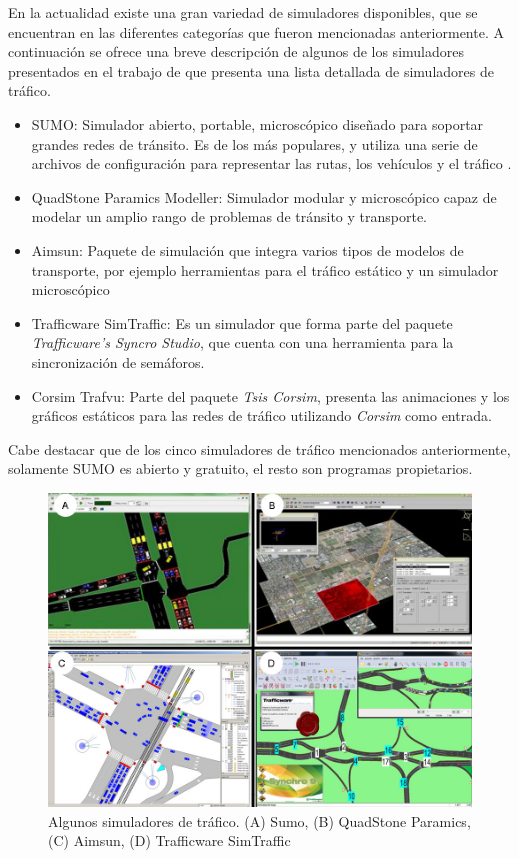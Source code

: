 En la actualidad existe una gran variedad de simuladores disponibles, que se encuentran en las diferentes categorías que fueron mencionadas anteriormente. A continuación se ofrece una breve descripción de algunos de los simuladores presentados en el trabajo de \citet{review_trafico} que presenta una lista detallada de simuladores de tráfico.
\begin{itemize}
	\item SUMO: Simulador abierto, portable, microscópico diseñado para soportar grandes redes de tránsito. Es de los más populares, y utiliza una serie de archivos de configuración para representar las rutas, los vehículos y el tráfico \citep{SUMO}.
	\item QuadStone Paramics Modeller: Simulador modular y microscópico capaz de modelar un amplio rango de problemas de tránsito y transporte.
	\item Aimsun: Paquete de simulación que integra varios tipos de modelos de transporte, por ejemplo herramientas para el tráfico estático y un simulador microscópico
	\item Trafficware SimTraffic: Es un simulador que forma parte del paquete \emph{Trafficware's Syncro Studio}, que cuenta con una herramienta para la sincronización de semáforos.
	\item Corsim Trafvu: Parte del paquete \emph{Tsis Corsim}, presenta las animaciones y los gráficos estáticos para las redes de tráfico utilizando \emph{Corsim} como entrada.
\end{itemize}

Cabe destacar que de los cinco simuladores de tráfico mencionados anteriormente, solamente SUMO es abierto y gratuito, el resto son programas propietarios. 

\begin{figure}[ht]
	\centering
	\includegraphics[width=0.9\linewidth]{Figures/simuladores}
	\caption[]{Algunos simuladores de tráfico. (A) Sumo, (B) QuadStone Paramics, (C) Aimsun, (D) Trafficware SimTraffic}
	\label{fig:simuladores}
\end{figure}

